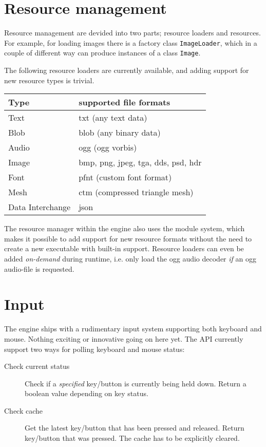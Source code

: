 \section{Resource management}
Resource management are devided into two parts; resource loaders and resources. For example, for loading images
there is a factory class \texttt{ImageLoader}, which in a couple of different way can produce instances of a class \texttt{Image}.

The following resource loaders are currently available, and adding support for new resource types is trivial.


\begin{tabular}{l l}
\textbf{Type}    & \textbf{supported file formats}\\
\hline
Text    & txt  (any text data)                  \\
Blob    & blob (any binary data)                \\
Audio   & ogg  (ogg vorbis)                     \\
Image   & bmp, png, jpeg, tga, dds, psd, hdr    \\
Font    & pfnt (custom font format)             \\
Mesh    & ctm  (compressed triangle mesh)       \\
Data Interchange & json                         \\
\end{tabular}


The resource manager within the engine also uses the module system, which makes it possible to add support for new resource formats without the need to create a new executable with built-in support. Resource loaders can even be added \textit{on-demand} during runtime, i.e. only load the ogg audio decoder \textit{if} an ogg audio-file is requested.

\newpage

\section{Input}
The engine ships with a rudimentary input system supporting both keyboard and mouse. Nothing exciting or
innovative going on here yet. The API currently support two ways for polling keyboard and mouse status:
\begin{description}
\item[Check current status] Check if a \textit{specified} key/button is currently being held down. Return a boolean value depending on key status.
\item[Check cache] Get the latest key/button that has been pressed and released. Return key/button that was pressed. The cache has to be explicitly cleared.
\end{description}

